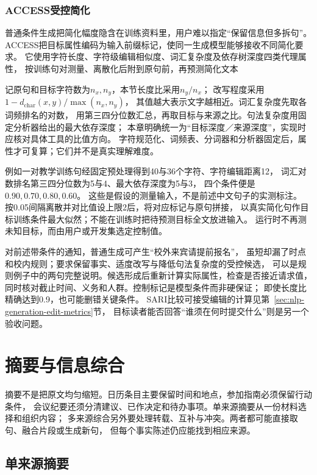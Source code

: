 \subsubsection{ACCESS受控简化}
\label{sec:nlp-generation-access}

普通条件生成把简化幅度隐含在训练资料里，用户难以指定“保留信息但多拆句”。
ACCESS把目标属性编码为输入前缀标记，使同一生成模型能够接收不同简化要求。
它使用字符长度、字符级编辑相似度、词汇复杂度及依存树深度四类代理属性，
按训练句对测量、离散化后附到原句前，再预测简化文本

记原句和目标字符数为$n_x,n_y$，本节长度比采用$n_y/n_x$；
改写程度采用$1-d_{\mathrm{char}}(x,y)/\max(n_x,n_y)$，
其值越大表示文字越相近。词汇复杂度先取各词频排名的对数，
用第三四分位数汇总，再取目标与来源之比。句法复杂度用固定分析器给出的最大依存深度；
本章明确统一为“目标深度／来源深度”，实现时应核对具体工具的比值方向。
字符规范化、词频表、分词器和分析器固定后，属性才可复算；它们并不是真实理解难度。

例如一对教学训练句经固定预处理得到40与36个字符、字符编辑距离12，
词汇对数排名第三四分位数为5与4、最大依存深度为5与3，
四个条件便是$0.90,0.70,0.80,0.60$。
这些是假设的测量输入，不是前述中文句子的实测标注。
按0.05间隔离散并对比值设上限2后，将对应标记与原句拼接，
以真实简化句作目标训练条件最大似然；不能在训练时把待预测目标全文放进输入。
运行时不再测未知目标，而由用户或开发集选定控制值。

对前述带条件的通知，普通生成可产生“校外来宾请提前报名”，
虽短却漏了时点和校内规则；要求保留事实、适度改写与降低句法复杂度的受控候选，
可以是规则例子中的两句完整说明。候选形成后重新计算实际属性，检查是否接近请求值，
同时核对截止时间、义务和人群。控制标记是模型条件而非硬保证；
即使长度比精确达到0.9，也可能删错关键条件。
SARI比较可接受编辑的计算见第~\ref{sec:nlp-generation-edit-metrics}节，
目标读者能否回答“谁须在何时提交什么”则是另一个验收问题。

\section{摘要与信息综合}
\label{sec:nlp-generation-summarization}

摘要不是把原文均匀缩短。日历条目主要保留时间和地点，参加指南必须保留行动条件，
会议纪要还须分清建议、已作决定和待办事项。单来源摘要从一份材料选择和组织内容；
多来源综合另外要处理转载、互补与冲突。两者都可能直接取句、融合片段或生成新句，
但每个事实陈述仍应能找到相应来源。

\subsection{单来源摘要}
\label{sec:nlp-generation-single-summary}


